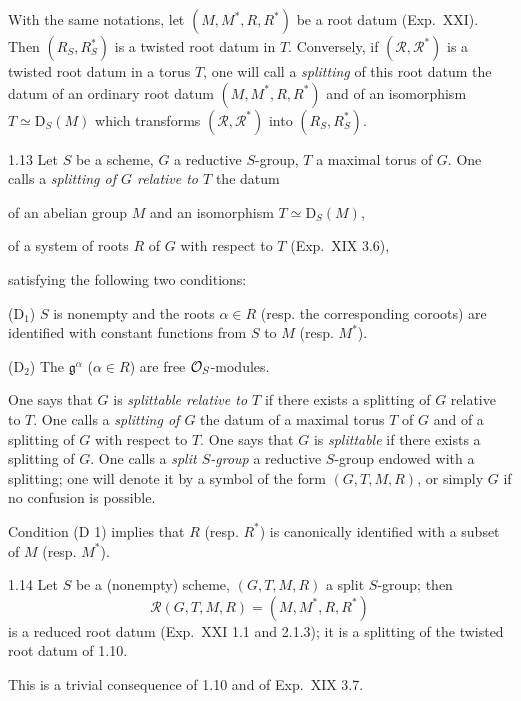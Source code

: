 \label{XXII.1.12}
With the same notations, let $(M,M^*,R,R^*)$ be a root datum (Exp.~XXI). Then $(R_S,R_S^*)$ is a twisted root datum in $T$. Conversely, if $(\mathcal R,\mathcal R^*)$ is a twisted root datum in a torus $T$, one will call a \emph{splitting} of this root datum the datum of an ordinary root datum $(M,M^*,R,R^*)$ and of an isomorphism $T\simeq\mathrm D_S(M)$ which transforms $(\mathcal R,\mathcal R^*)$ into $(R_S,R_S^*)$.
\begin{definition}{1.13}\label{XXII.1.13}
Let $S$ be a scheme, $G$ a reductive $S$-group, $T$ a maximal torus of $G$. One calls a \emph{splitting of $G$ relative to $T$} the datum
\begin{enumeratei}
\item of an abelian group $M$ and an isomorphism $T\simeq\mathrm D_S(M)$,
\item of a system of roots $R$ of $G$ with respect to $T$ (Exp.~XIX 3.6),
\end{enumeratei}
satisfying the following two conditions:

(D$_1$) $S$ is nonempty and the roots $\alpha\in R$ (resp. the corresponding coroots) are identified with constant functions from $S$ to $M$ (resp. $M^*$).

(D$_2$) The $\mathfrak g^\alpha$ ($\alpha\in R$) are free $\mathcal{O}_S$-modules.

One says that $G$ is \emph{splittable relative to $T$} if there exists a splitting of $G$ relative to $T$. One calls a \emph{splitting of $G$} the datum of a maximal torus $T$ of $G$ and of a splitting of $G$ with respect to $T$. One says that $G$ is \emph{splittable} if there exists a splitting of $G$. One calls a \emph{split $S$-group} a reductive $S$-group endowed with a splitting; one will denote it by a symbol of the form $(G,T,M,R)$, or simply $G$ if no confusion is possible.

Condition (D 1) implies that $R$ (resp. $R^*$) is canonically identified with a subset of $M$ (resp. $M^*$).
\end{definition}
\begin{proposition}{1.14}\label{XXII.1.14}
Let $S$ be a (nonempty) scheme, $(G,T,M,R)$ a split $S$-group; then
\[
\mathscr R(G,T,M,R)=(M,M^*,R,R^*)
\]
is a reduced root datum (Exp.~XXI 1.1 and 2.1.3); it is a splitting of the twisted root datum of 1.10.
\end{proposition}
This is a trivial consequence of 1.10 and of Exp.~XIX 3.7.

